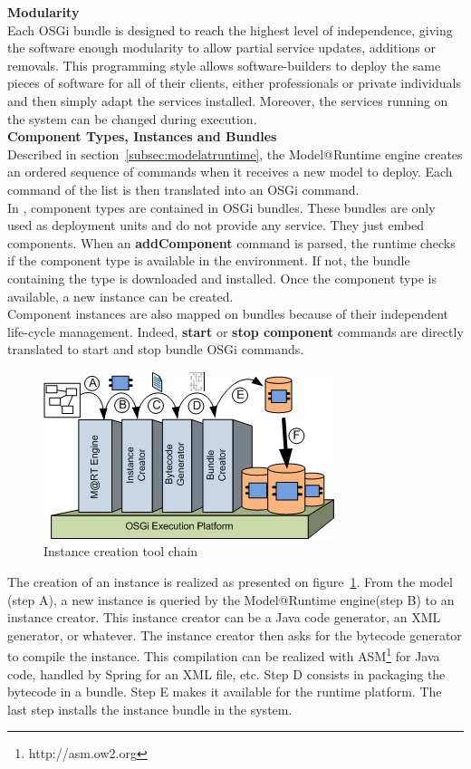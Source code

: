 {\bf Modularity}\\
Each OSGi bundle is designed to reach the highest level of independence, giving the software enough modularity to allow partial service updates, additions or removals. This programming style allows software-builders to deploy the same pieces of software for all of their clients, either professionals or private individuals and then simply adapt the services installed. Moreover, the services running on the system can be changed during execution.\\

\vspace{0.5cm}
{\bf Component Types, Instances and Bundles}\\
Described in section~\ref{subsec:modelatruntime}, the Model@Runtime engine creates an ordered sequence of commands when it receives a new model to deploy. Each command of the list is then translated into an OSGi command.\\
In \enti{}, component types are contained in OSGi bundles. These bundles are only used as deployment units and do not provide any service. They just embed components. When an {\bf addComponent} command is parsed, the runtime checks if the component type is available in the environment. If not, the bundle containing the type is downloaded and installed. Once the component type is available, a new instance can be created.\\
Component instances are also mapped on bundles because of their independent life-cycle management. Indeed, {\bf start} or {\bf stop component} commands are directly translated to start and stop bundle OSGi commands.\\
\begin{figure}[h!]
\centering
  \includegraphics[width=.6\textwidth]{part2/pics/toolchain3.png}
  \caption{Instance creation tool chain}
  \label{fig:instanceToolChain}
\end{figure}

The creation of an instance is realized as presented on figure~\ref{fig:instanceToolChain}. From the model (step A), a new instance is queried by the Model@Runtime engine(step B) to an instance creator. This instance creator can be a Java code generator, an XML generator, or whatever. The instance creator then asks for the bytecode generator to compile the instance. This compilation can be realized with ASM\footnote{http://asm.ow2.org} for Java code, handled by Spring for an XML file, etc. Step D consists in packaging the bytecode in a bundle. Step E makes it available for the runtime platform. The last step installs the instance bundle in the system.\\

